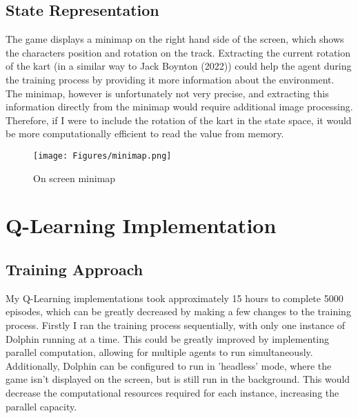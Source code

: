 \subsection{State Representation}
The game displays a minimap on the right hand side of the screen, which shows the characters position and rotation on the track. Extracting the current rotation of the kart (in a similar way to Jack Boynton (2022)) could help the agent during the training process by providing it more information about the environment. The minimap, however is unfortunately not very precise, and extracting this information directly from the minimap would require additional image processing. Therefore, if I were to include the rotation of the kart in the state space, it would be more computationally efficient to read the value from memory.
\begin{figure}[htb]
    \centering
    \texttt{[image: Figures/minimap.png]}
    \caption{On screen minimap}
    \label{fig:minimap}
\end{figure}
\section{Q-Learning Implementation}
\subsection{Training Approach}
My Q-Learning implementations took approximately 15 hours to complete 5000 episodes, which can be greatly decreased by making a few changes to the training process. Firstly I ran the training process sequentially, with only one instance of Dolphin running at a time. This could be greatly improved by implementing parallel computation, allowing for multiple agents to run simultaneously. Additionally, Dolphin can be configured to run in 'headless' mode, where the game isn't displayed on the screen, but is still run in the background. This would decrease the computational resources required for each instance, increasing the parallel capacity. 
